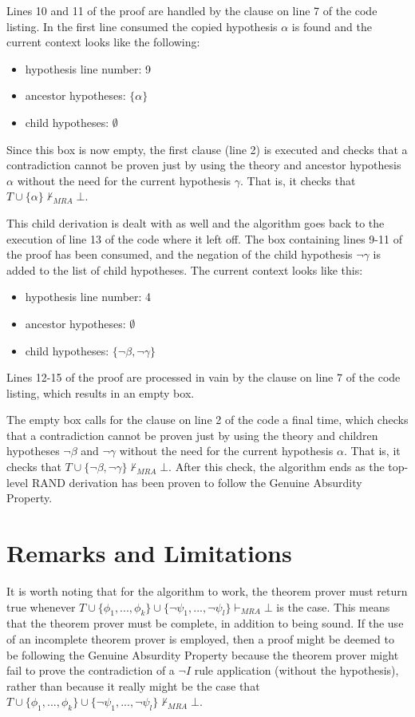 \documentclass[11pt,twoside,a4paper]{report}
\begin{document}
Lines 10 and 11 of the proof are handled by the clause on line 7 of the code listing. In the first line consumed the copied hypothesis $\alpha$ is found and the current context looks like the following: 
\begin{itemize}
\item
hypothesis line number: 9
\item
ancestor hypotheses: $\{\alpha\}$
\item
child hypotheses: $\emptyset$
\end{itemize}

Since this box is now empty, the first clause (line 2) is executed and checks that a contradiction cannot be proven just by using the theory and ancestor hypothesis $\alpha$ without the need for the current hypothesis $\gamma$. That is, it checks that $T\cup\{\alpha\}\nvdash_{MRA}\bot$.

This child derivation is dealt with as well and the algorithm goes back to the execution of line 13 of the code where it left off. The box containing lines 9-11 of the proof has been consumed, and the negation of the child hypothesis $\neg\gamma$ is added to the list of child hypotheses. The current context looks like this:
\begin{itemize}
\item
hypothesis line number: 4
\item
ancestor hypotheses: $\emptyset$
\item
child hypotheses: $\{\neg\beta, \neg\gamma\}$
\end{itemize}

Lines 12-15 of the proof are processed in vain by the clause on line 7 of the code listing, which results in an empty box.

The empty box calls for the clause on line 2 of the code a final time, which checks that a contradiction cannot be proven just by using the theory and children hypotheses $\neg\beta$ and $\neg\gamma$ without the need for the current hypothesis $\alpha$. That is, it checks that $T\cup\{\neg\beta, \neg\gamma\}\nvdash_{MRA}\bot$. After this check, the algorithm ends as the top-level RAND derivation has been proven to follow the Genuine Absurdity Property.

\section{Remarks and Limitations}
It is worth noting that for the algorithm to work, the theorem prover must return true whenever $T\cup\{\phi_1, ..., \phi_k\}\cup\{\neg\psi_1, ..., \neg\psi_l\}\vdash_{MRA}\bot$ is the case. This means that the theorem prover must be complete, in addition to being sound. If the use of an incomplete theorem prover is employed, then a proof might be deemed to be following the Genuine Absurdity Property because the theorem prover might fail to prove the contradiction of a $\neg I$ rule application (without the hypothesis), rather than because it really might be the case that $T\cup\{\phi_1, ..., \phi_k\}\cup\{\neg\psi_1, ..., \neg\psi_l\}\nvdash_{MRA}\bot$. 
\end{document}
